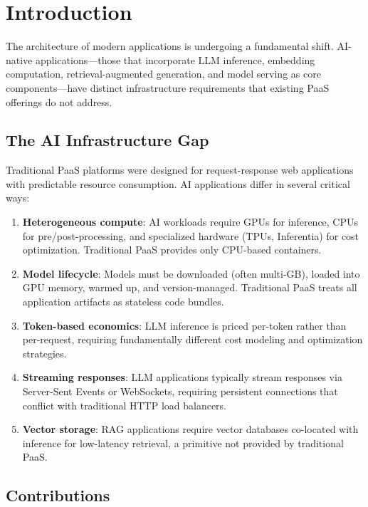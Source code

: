 \section{Introduction}

\label{sec:intro}

The architecture of modern applications is undergoing a fundamental shift. AI-native applications---those that incorporate LLM inference, embedding computation, retrieval-augmented generation, and model serving as core components---have distinct infrastructure requirements that existing PaaS offerings do not address.

\subsection{The AI Infrastructure Gap}

Traditional PaaS platforms were designed for request-response web applications with predictable resource consumption. AI applications differ in several critical ways:

\begin{enumerate}[leftmargin=1.4em]
    \item \textbf{Heterogeneous compute}: AI workloads require GPUs for inference, CPUs for pre/post-processing, and specialized hardware (TPUs, Inferentia) for cost optimization. Traditional PaaS provides only CPU-based containers.
    \item \textbf{Model lifecycle}: Models must be downloaded (often multi-GB), loaded into GPU memory, warmed up, and version-managed. Traditional PaaS treats all application artifacts as stateless code bundles.
    \item \textbf{Token-based economics}: LLM inference is priced per-token rather than per-request, requiring fundamentally different cost modeling and optimization strategies.
    \item \textbf{Streaming responses}: LLM applications typically stream responses via Server-Sent Events or WebSockets, requiring persistent connections that conflict with traditional HTTP load balancers.
    \item \textbf{Vector storage}: RAG applications require vector databases co-located with inference for low-latency retrieval, a primitive not provided by traditional PaaS.
\end{enumerate}

\subsection{Contributions}

